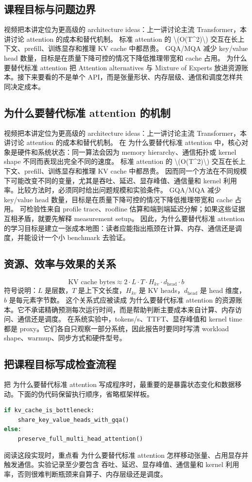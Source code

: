 \documentclass[a4paper]{article}
\begin{document}
\subsection{课程目标与问题边界}
视频把本讲定位为更高级的 architecture ideas：上一讲讨论主流 Transformer，本讲讨论 attention 的成本和替代机制。
标准 attention 的 \textbackslash{}(O(T\textasciicircum{}2)\textbackslash{}) 交互在长上下文、prefill、训练显存和推理 KV cache 中都昂贵。
GQA/MQA 减少 key/value head 数量，目标是在质量下降可控的情况下降低推理带宽和 cache 占用。
为什么要替代标准 attention 把 Attention alternatives 与 Mixture of Experts 放进资源账本。接下来要看的不是单个 API，而是张量形状、内存层级、通信和调度怎样共同决定成本。
\subsection{为什么要替代标准 attention 的机制}
视频把本讲定位为更高级的 architecture ideas：上一讲讨论主流 Transformer，本讲讨论 attention 的成本和替代机制。 在 为什么要替代标准 attention 中，核心对象是硬件和系统状态：同一算法会因为 memory hierarchy、通信拓扑或 kernel shape 不同而表现出完全不同的速度。
标准 attention 的 \textbackslash{}(O(T\textasciicircum{}2)\textbackslash{}) 交互在长上下文、prefill、训练显存和推理 KV cache 中都昂贵。 因而同一个方法在不同规模下可能改变不同的变量，尤其是吞吐、延迟、显存峰值、通信量和 kernel 利用率。比较方法时，必须同时给出问题规模和实验条件。
GQA/MQA 减少 key/value head 数量，目标是在质量下降可控的情况下降低推理带宽和 cache 占用。 可检验性来自 profile trace、roofline 估算和端到端延迟分解；如果这些证据互相矛盾，就要先解释 measurement setup。
因此，为什么要替代标准 attention 的学习目标是建立一张成本地图：读者应能指出瓶颈在计算、内存、通信还是调度，并能设计一个小 benchmark 去验证。
\subsection{资源、效率与效果的关系}
\[\text{KV cache bytes}\approx 2\cdot L\cdot T\cdot H_{kv}\cdot d_{\text{head}}\cdot b\]
符号说明：\(L\) 是层数，\(T\) 是上下文长度，\(H_{kv}\) 是 KV heads，\(d_{\text{head}}\) 是 head 维度，\(b\) 是每元素字节数。
这个关系式应被读成 为什么要替代标准 attention 的资源账本。它不承诺精确预测每次运行时间，而是帮助判断主要成本来自计算、内存访问、通信还是调度。
在系统实验中，tokens/s、TTFT、显存峰值和 kernel time 都是 proxy。它们各自只观察一部分系统，因此报告时要同时写清 workload shape、warmup、同步方式和硬件型号。
\subsection{把课程目标写成检查流程}
把 为什么要替代标准 attention 写成程序时，最重要的是暴露状态变化和数据移动。下面的伪代码保留执行顺序，省略框架样板。
\begin{lstlisting}[language=Python]
if kv_cache_is_bottleneck:
    share_key_value_heads_with_gqa()
else:
    preserve_full_multi_head_attention()
\end{lstlisting}
阅读这段实现时，重点看 为什么要替代标准 attention 怎样移动张量、占用显存并触发通信。实验记录至少要包含 吞吐、延迟、显存峰值、通信量和 kernel 利用率，否则很难判断瓶颈来自算子、内存层级还是调度。
\end{document}

